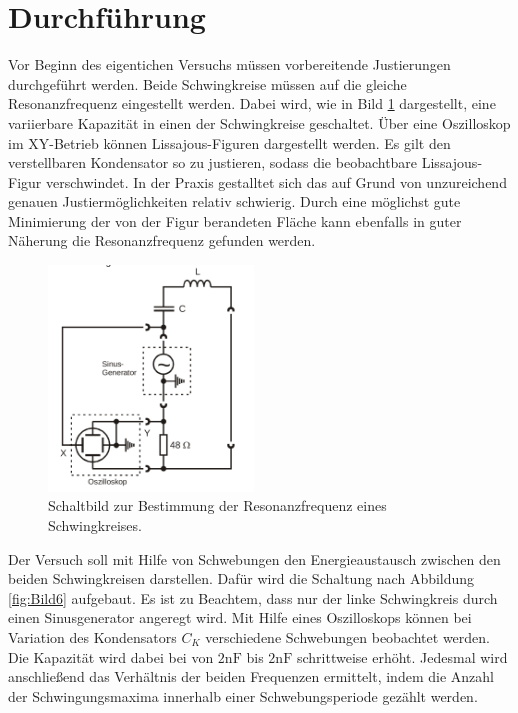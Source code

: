 \section{Durchführung}
\label{sec:Durchführung}

Vor Beginn des eigentichen Versuchs müssen vorbereitende Justierungen durchgeführt werden. Beide Schwingkreise müssen 
auf die gleiche Resonanzfrequenz eingestellt werden.
Dabei wird, wie in Bild \ref{fig:Bild5} dargestellt, eine variierbare Kapazität in einen der Schwingkreise geschaltet. Über eine
Oszilloskop im XY-Betrieb können Lissajous-Figuren dargestellt werden. Es gilt den verstellbaren Kondensator so zu justieren, sodass die beobachtbare
Lissajous-Figur verschwindet. In der Praxis gestalltet sich das auf Grund von unzureichend genauen Justiermöglichkeiten relativ schwierig. Durch eine möglichst gute Minimierung der von der Figur berandeten Fläche kann
ebenfalls in guter Näherung die Resonanzfrequenz gefunden werden. 

\begin{figure}
\label{fig:Bild5}
    \centering
    \includegraphics[height=6.0cm]{data/Bild5.png}
    \caption{Schaltbild zur Bestimmung der Resonanzfrequenz eines Schwingkreises.}
\end{figure}

Der Versuch soll mit Hilfe von Schwebungen den Energieaustausch zwischen den beiden Schwingkreisen darstellen.
Dafür wird die Schaltung nach Abbildung \ref{fig:Bild6} aufgebaut. Es ist zu Beachtem, dass nur der linke Schwingkreis durch einen Sinusgenerator angeregt wird.
Mit Hilfe eines Oszilloskops können bei Variation des 
Kondensators $C_K$ verschiedene Schwebungen beobachtet werden. Die Kapazität wird dabei bei von $2\si{\nano\farad}$  bis $2\si{\nano\farad}$
schrittweise erhöht. Jedesmal wird anschließend das Verhältnis der beiden Frequenzen ermittelt, indem die Anzahl der Schwingungsmaxima innerhalb einer Schwebungsperiode 
gezählt werden.



